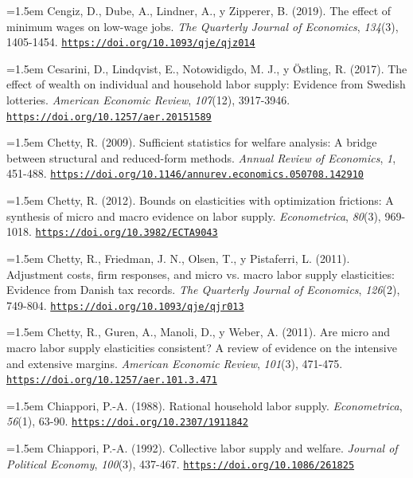 \documentclass[10pt,a4paper]{article}
\begin{document}
\noindent\hangindent=1.5em Cengiz, D., Dube, A., Lindner, A., y Zipperer, B. (2019). The effect of minimum wages on low-wage jobs. \textit{The Quarterly Journal of Economics}, \textit{134}(3), 1405-1454. \href{https://doi.org/10.1093/qje/qjz014}{\nolinkurl{https://doi.org/10.1093/qje/qjz014}}

\noindent\hangindent=1.5em Cesarini, D., Lindqvist, E., Notowidigdo, M. J., y Östling, R. (2017). The effect of wealth on individual and household labor supply: Evidence from Swedish lotteries. \textit{American Economic Review}, \textit{107}(12), 3917-3946. \href{https://doi.org/10.1257/aer.20151589}{\nolinkurl{https://doi.org/10.1257/aer.20151589}}

\noindent\hangindent=1.5em Chetty, R. (2009). Sufficient statistics for welfare analysis: A bridge between structural and reduced-form methods. \textit{Annual Review of Economics}, \textit{1}, 451-488. \href{https://doi.org/10.1146/annurev.economics.050708.142910}{\nolinkurl{https://doi.org/10.1146/annurev.economics.050708.142910}}

\noindent\hangindent=1.5em Chetty, R. (2012). Bounds on elasticities with optimization frictions: A synthesis of micro and macro evidence on labor supply. \textit{Econometrica}, \textit{80}(3), 969-1018. \href{https://doi.org/10.3982/ECTA9043}{\nolinkurl{https://doi.org/10.3982/ECTA9043}}

\noindent\hangindent=1.5em Chetty, R., Friedman, J. N., Olsen, T., y Pistaferri, L. (2011). Adjustment costs, firm responses, and micro vs. macro labor supply elasticities: Evidence from Danish tax records. \textit{The Quarterly Journal of Economics}, \textit{126}(2), 749-804. \href{https://doi.org/10.1093/qje/qjr013}{\nolinkurl{https://doi.org/10.1093/qje/qjr013}}

\noindent\hangindent=1.5em Chetty, R., Guren, A., Manoli, D., y Weber, A. (2011). Are micro and macro labor supply elasticities consistent? A review of evidence on the intensive and extensive margins. \textit{American Economic Review}, \textit{101}(3), 471-475. \href{https://doi.org/10.1257/aer.101.3.471}{\nolinkurl{https://doi.org/10.1257/aer.101.3.471}}

\noindent\hangindent=1.5em Chiappori, P.-A. (1988). Rational household labor supply. \textit{Econometrica}, \textit{56}(1), 63-90. \href{https://doi.org/10.2307/1911842}{\nolinkurl{https://doi.org/10.2307/1911842}}

\noindent\hangindent=1.5em Chiappori, P.-A. (1992). Collective labor supply and welfare. \textit{Journal of Political Economy}, \textit{100}(3), 437-467. \href{https://doi.org/10.1086/261825}{\nolinkurl{https://doi.org/10.1086/261825}}
\end{document}
